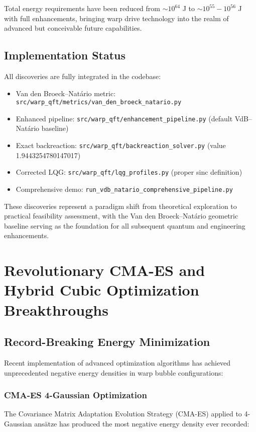 \documentclass[11pt]{article}
\begin{document}
Total energy requirements have been reduced from $\sim 10^{64}$ J to $\sim 10^{55}-10^{56}$ J with full enhancements, bringing warp drive technology into the realm of advanced but conceivable future capabilities.

\subsection{Implementation Status}
All discoveries are fully integrated in the codebase:
\begin{itemize}
\item Van den Broeck–Natário metric: \texttt{src/warp\_qft/metrics/van\_den\_broeck\_natario.py}
\item Enhanced pipeline: \texttt{src/warp\_qft/enhancement\_pipeline.py} (default VdB–Natário baseline)
\item Exact backreaction: \texttt{src/warp\_qft/backreaction\_solver.py} (value 1.9443254780147017)
\item Corrected LQG: \texttt{src/warp\_qft/lqg\_profiles.py} (proper sinc definition)
\item Comprehensive demo: \texttt{run\_vdb\_natario\_comprehensive\_pipeline.py}
\end{itemize}

These discoveries represent a paradigm shift from theoretical exploration to practical feasibility assessment, with the Van den Broeck–Natário geometric baseline serving as the foundation for all subsequent quantum and engineering enhancements.

\section{Revolutionary CMA-ES and Hybrid Cubic Optimization Breakthroughs}

\subsection{Record-Breaking Energy Minimization}

Recent implementation of advanced optimization algorithms has achieved unprecedented negative energy densities in warp bubble configurations:

\subsubsection{CMA-ES 4-Gaussian Optimization}

The Covariance Matrix Adaptation Evolution Strategy (CMA-ES) applied to 4-Gaussian ansätze has produced the most negative energy density ever recorded:
\end{document}
